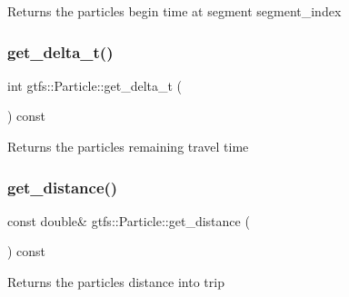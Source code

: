 \begin{DoxyReturn}{Returns}
the particle\textquotesingle{}s begin time at segment {\ttfamily segment\+\_\+index} 
\end{DoxyReturn}
\mbox{\label{classgtfs_1_1Particle_ae2029ee7ae66a92a8a2f08e4290daa73}} 
\subsubsection{\texorpdfstring{get\+\_\+delta\+\_\+t()}{get\_delta\_t()}}
{\footnotesize\ttfamily int gtfs\+::\+Particle\+::get\+\_\+delta\+\_\+t (\begin{DoxyParamCaption}{ }\end{DoxyParamCaption}) const\hspace{0.3cm}{\ttfamily [inline]}}

\begin{DoxyReturn}{Returns}
the particle\textquotesingle{}s remaining travel time 
\end{DoxyReturn}
\mbox{\label{classgtfs_1_1Particle_a0ec3ee5a83e778069946242a6d7731b6}} 
\subsubsection{\texorpdfstring{get\+\_\+distance()}{get\_distance()}}
{\footnotesize\ttfamily const double\& gtfs\+::\+Particle\+::get\+\_\+distance (\begin{DoxyParamCaption}{ }\end{DoxyParamCaption}) const\hspace{0.3cm}{\ttfamily [inline]}}

\begin{DoxyReturn}{Returns}
the particle\textquotesingle{}s distance into trip 
\end{DoxyReturn}
\mbox{\label{classgtfs_1_1Particle_aaea44cde86b5b026c94800c6d837f174}} 
